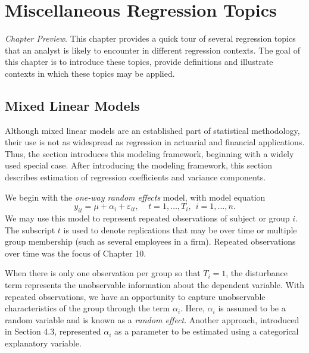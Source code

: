\setcounter{chapter}{14}

\chapter{Miscellaneous Regression Topics}


{\small \textit{Chapter Preview}. This chapter provides a quick tour
of several regression topics that an analyst is likely to encounter
in different regression contexts. The goal of this chapter is to
introduce these topics, provide definitions and illustrate contexts
in which these topics may be applied.}


\section{Mixed Linear Models}\label{S15:MixedLM}

Although mixed linear models are an established part of statistical
methodology, their use is not as widespread as regression in
actuarial and financial applications. Thus, the section introduces
this modeling framework, beginning with a widely used special case.
After introducing the modeling framework, this section describes
estimation of regression coefficients and variance components.

We begin with the \emph{one-way random effects} model, with model
equation
\begin{equation}\label{E15:OneWayRE}
y_{it} = \mu + \alpha_i + \varepsilon_{it}, ~~~~~ t=1, \ldots, T_i,
~~ i=1,\ldots, n.
\end{equation}
We may use this model to represent repeated observations of subject
or group $i$. The subscript $t$ is used to denote replications that
may be over time or multiple group membership (such as several
employees in a firm). Repeated observations over time was the focus
of Chapter 10.

When there is only one observation per group so that $T_i=1$, the
disturbance term represents the unobservable information about the
dependent variable. With repeated observations, we have an
opportunity to capture unobservable characteristics of the group
through the term $\alpha_i$. Here, $\alpha_i$ is assumed to be a
random variable and is known as a \emph{random effect}. Another
approach, introduced in Section 4.3, represented $\alpha_i$ as a
parameter to be estimated using a categorical explanatory variable.

